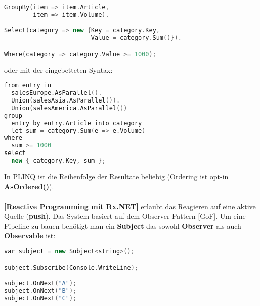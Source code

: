 \documentclass[8pt]{extarticle}
\let\oldtextbf\textbf
\renewcommand{\textbf}{\tiny\oldtextbf}
\begin{document}
\begin{multicols*}{5}
\begin{lstlisting}[language=c++]
GroupBy(item => item.Article,
        item => item.Volume).

Select(category => new {Key = category.Key,
                        Value = category.Sum()}).

Where(category => category.Value >= 1000);
\end{lstlisting}
oder mit der eingebetteten Syntax:
\begin{lstlisting}[language=c++]
from entry in
  salesEurope.AsParallel().
  Union(salesAsia.AsParallel()).
  Union(salesAmerica.AsParallel())
group
  entry by entry.Article into category
  let sum = category.Sum(e => e.Volume)
where
  sum >= 1000
select
  new { category.Key, sum };
\end{lstlisting}
In PLINQ ist die Reihenfolge der Resultate beliebig (Ordering ist opt-in \textbf{AsOrdered()}).\\\\
\textbf{[Reactive Programming mit Rx.NET]} erlaubt das Reagieren auf eine aktive Quelle (\textbf{push}). Das System basiert auf dem Observer Pattern [GoF]. Um eine Pipeline zu bauen benötigt man ein \textbf{Subject} das sowohl \textbf{Observer} als auch \textbf{Observable} ist:
\begin{lstlisting}[language=c++]
var subject = new Subject<string>();

subject.Subscribe(Console.WriteLine);

subject.OnNext("A");
subject.OnNext("B");
subject.OnNext("C");


\end{lstlisting}
\end{multicols*}
\end{document}
